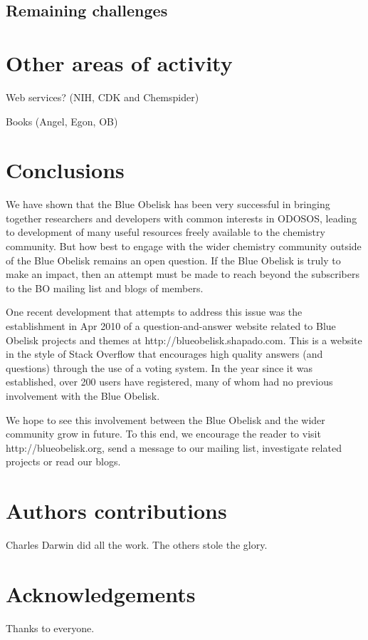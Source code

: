 \documentclass[10pt]{bmc_article}
\newenvironment{bmcformat}{\begin{raggedright}\baselineskip20pt\sloppy\setboolean{publ}{false}}{\end{raggedright}\baselineskip20pt\sloppy}
\begin{document}
\begin{bmcformat}
  \subsection*{Remaining challenges}

\section*{Other areas of activity}
Web services? (NIH, CDK and Chemspider)

Books (Angel, Egon, OB)

\section*{Conclusions}

We have shown that the Blue Obelisk has been very successful
in bringing together researchers and developers with common interests
in ODOSOS, leading to development of many useful resources freely
available to the chemistry community. But how best to engage with the
wider chemistry community outside of the Blue Obelisk remains an open
question. If the Blue Obelisk is truly to make an impact,
then an attempt must be made to reach beyond the subscribers to the
BO mailing list and blogs of members.

One recent development
that attempts to address this issue was the establishment in Apr 2010 of a
question-and-answer
website related to Blue Obelisk projects and themes at
http://blueobelisk.shapado.com. This is a website in the
style of Stack Overflow that encourages high quality answers (and
questions) through the use of a voting system. In the year since it
was established, over
200 users have registered, many of whom had no previous involvement
with the Blue Obelisk.

We hope to see this involvement between the Blue Obelisk and the wider
community grow in future. To this end, we encourage the reader to
visit http://blueobelisk.org, send a message to our mailing list,
investigate related projects or read our blogs.


\section*{Authors contributions}
   Charles Darwin did all the work. The others stole the glory. 
    

\section*{Acknowledgements}
  Thanks to everyone.



\end{bmcformat}
\end{document}
